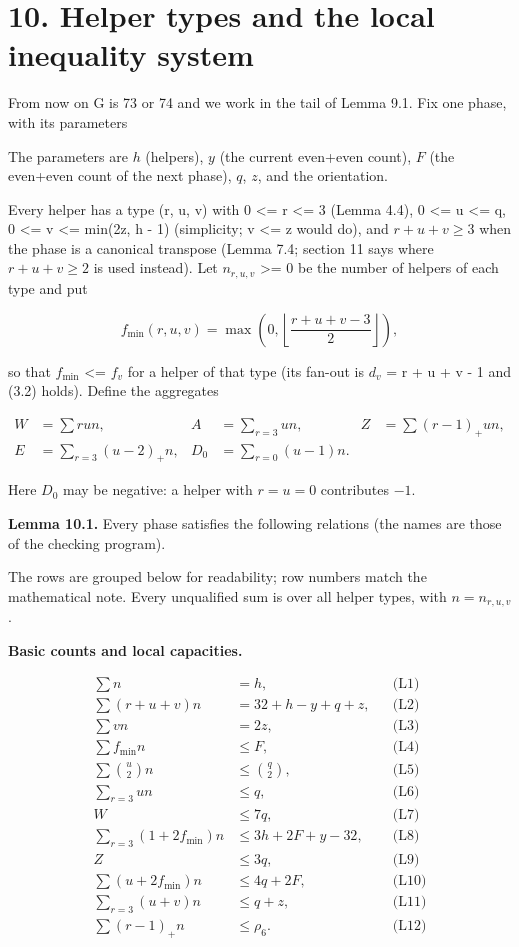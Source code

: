 \hypertarget{helper-types-and-the-local-inequality-system}{%
\section{10. Helper types and the local inequality system}\label{helper-types-and-the-local-inequality-system}}

From now on G is 73 or 74 and we work in the tail of Lemma 9.1. Fix one phase, with its parameters

The parameters are \(h\) (helpers), \(y\) (the current even+even count), \(F\) (the even+even count of the next phase), \(q\), \(z\), and the orientation.

Every helper has a type (r, u, v) with 0 \textless= r \textless= 3 (Lemma 4.4), 0 \textless= u \textless= q, 0 \textless= v \textless= min(2z, h - 1) (simplicity; v \textless= z would do), and \(r+u+v\ge3\) when the phase is a canonical transpose (Lemma 7.4; section 11 says where \(r+u+v\ge2\) is used instead). Let \(n_{r,u,v}\) \textgreater= 0 be the number of helpers of each type and put

\[
f_{\min}(r,u,v)=\max\!\left(0,\left\lfloor\frac{r+u+v-3}{2}\right\rfloor\right),
\]

so that \(f_{\min}\) \textless= \(f_v\) for a helper of that type (its fan-out is \(d_v\) = r + u + v - 1 and (3.2) holds). Define the aggregates

\[
\begin{aligned}
W&=\sum run,&A&=\sum_{r=3}un,&Z&=\sum(r-1)_+un,\\
E&=\sum_{r=3}(u-2)_+n,&D_0&=\sum_{r=0}(u-1)n.
\end{aligned}
\]

Here \(D_0\) may be negative: a helper with \(r=u=0\) contributes \(-1\).

\textbf{Lemma 10.1.} Every phase satisfies the following relations (the names are those of the checking program).

The rows are grouped below for readability; row numbers match the mathematical note. Every unqualified sum is over all helper types, with \(n=n_{r,u,v}\).

\textbf{Basic counts and local capacities.}

\[
\begin{aligned}
\sum n&=h,&&\text{(L1)}\\
\sum(r+u+v)n&=32+h-y+q+z,&&\text{(L2)}\\
\sum vn&=2z,&&\text{(L3)}\\
\sum f_{\min}n&\le F,&&\text{(L4)}\\
\sum\binom u2n&\le\binom q2,&&\text{(L5)}\\
\sum_{r=3}un&\le q,&&\text{(L6)}\\
W&\le7q,&&\text{(L7)}\\
\sum_{r=3}(1+2f_{\min})n&\le3h+2F+y-32,&&\text{(L8)}\\
Z&\le3q,&&\text{(L9)}\\
\sum(u+2f_{\min})n&\le4q+2F,&&\text{(L10)}\\
\sum_{r=3}(u+v)n&\le q+z,&&\text{(L11)}\\
\sum(r-1)_+n&\le\rho_6.&&\text{(L12)}
\end{aligned}
\]

